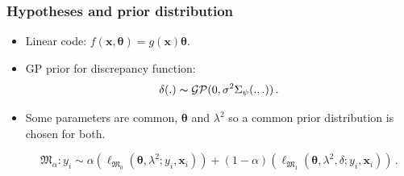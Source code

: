 \documentclass[nopagenumber,9pt]{beamer}
\newcommand{\btheta}{\boldsymbol{\theta}}
\newcommand{\bx}{\mathbf{x}}
\newcommand\MF{{\mathfrak{M}}}
\begin{document}
\begin{frame}
 \frametitle{Hypotheses and prior distribution}
 
 \begin{itemize}
 
 \item Linear code: $f(\bx,\pmb{\theta})=g(\bx)\pmb{\theta}$.
 \bigskip
 
 \item GP prior for discrepancy function:
 $$\delta(.)\thicksim\mathcal{GP}(0,\sigma^2\Sigma_{{\psi}}(.,.))\,.$$
 
 \bigskip
 
 \item Some parameters are common, $\btheta$ and $\lambda^2$ so a common prior distribution is chosen for both.
 
 
 \begin{equation*}\label{eq:1}
\MF_\alpha: y_i\sim \alpha \left(\ell_{\MF_0}(\pmb{\theta}, \lambda^2;y_i, \bx_i)\right)+(1-\alpha)\left(\ell_{\MF_1}(\pmb{\theta}, \lambda^2, \delta;y_i, \bx_i)\right)\,.
\end{equation*}

 
 \end{itemize}

 

 
 \end{frame}

 
 
\end{document}
